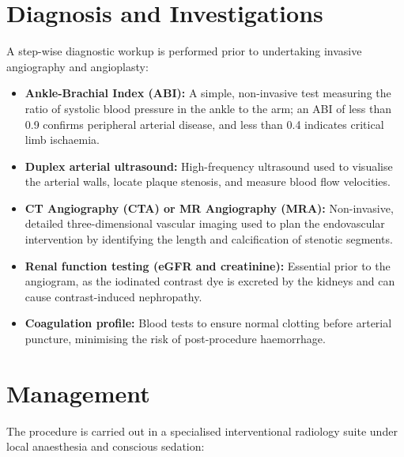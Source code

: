\section*{Diagnosis and Investigations}
A step-wise diagnostic workup is performed prior to undertaking invasive angiography and angioplasty:

\begin{itemize}
    \item \textbf{Ankle-Brachial Index (ABI):} A simple, non-invasive test measuring the ratio of systolic blood pressure in the ankle to the arm; an ABI of less than 0.9 confirms peripheral arterial disease, and less than 0.4 indicates critical limb ischaemia.
    \item \textbf{Duplex arterial ultrasound:} High-frequency ultrasound used to visualise the arterial walls, locate plaque stenosis, and measure blood flow velocities.
    \item \textbf{CT Angiography (CTA) or MR Angiography (MRA):} Non-invasive, detailed three-dimensional vascular imaging used to plan the endovascular intervention by identifying the length and calcification of stenotic segments.
    \item \textbf{Renal function testing (eGFR and creatinine):} Essential prior to the angiogram, as the iodinated contrast dye is excreted by the kidneys and can cause contrast-induced nephropathy.
    \item \textbf{Coagulation profile:} Blood tests to ensure normal clotting before arterial puncture, minimising the risk of post-procedure haemorrhage.
\end{itemize}

\section*{Management}
The procedure is carried out in a specialised interventional radiology suite under local anaesthesia and conscious sedation:

